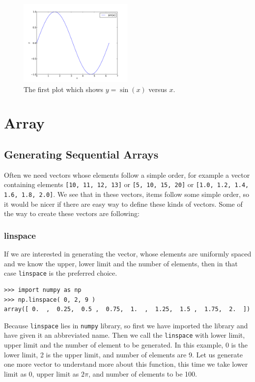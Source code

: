 \documentclass[10pt]{book}
\begin{document}
{\beforefig
\begin{figure}[h!]
  \centering
    \includegraphics[width=0.5\textwidth]{images/1.pdf}
  \caption{The first plot which shows $y = \sin(x)$ versus $x$. }
  \label{fig:1}
\end{figure}
\afterfig

\chapter{Array}
\section{Generating Sequential Arrays}
Often we need vectors whose elements follow a simple order, for example a vector containing elements \verb"[10, 11, 12, 13]" or \verb"[5, 10, 15, 20]" or \verb"[1.0, 1.2, 1.4, 1.6, 1.8, 2.0]". We see that in these vectors, items follow some simple order, so it would be nicer if there are easy way to define these kinds of vectors. Some of the way to create these vectors are following: 

\subsection{linspace}
If we are interested in generating the vector, whose elements are uniformly spaced and we know the upper, lower limit and the number of elements, then in that case \verb"linspace" is the preferred choice. 
\beforeverb
\begin{verbatim}
>>> import numpy as np
>>> np.linspace( 0, 2, 9 )       
array([ 0.  ,  0.25,  0.5 ,  0.75,  1.  ,  1.25,  1.5 ,  1.75,  2.  ])
\end{verbatim}
\afterverb
Because \verb"linspace" lies in \verb"numpy" library, so first we have imported the library and have given it an abbreviated name. Then we call the \verb"linspace" with lower limit, upper limit and the number of element to be generated. In this example, 0 is the lower limit, 2 is the upper limit, and number of elements are 9. Let us generate one more vector to understand more about this function, this time we take lower limit as 0, upper limit as $2\pi$, and number of elements to be 100.  

}
\end{document}
